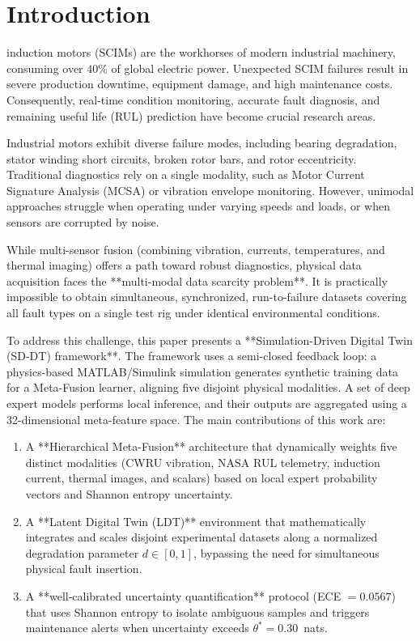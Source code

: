 \documentclass[journal]{IEEEtran}
\begin{document}
\section{Introduction}
 induction motors (SCIMs) are the workhorses of modern industrial machinery, consuming over $40\%$ of global electric power. Unexpected SCIM failures result in severe production downtime, equipment damage, and high maintenance costs. Consequently, real-time condition monitoring, accurate fault diagnosis, and remaining useful life (RUL) prediction have become crucial research areas.

Industrial motors exhibit diverse failure modes, including bearing degradation, stator winding short circuits, broken rotor bars, and rotor eccentricity. Traditional diagnostics rely on a single modality, such as Motor Current Signature Analysis (MCSA) or vibration envelope monitoring. However, unimodal approaches struggle when operating under varying speeds and loads, or when sensors are corrupted by noise.

While multi-sensor fusion (combining vibration, currents, temperatures, and thermal imaging) offers a path toward robust diagnostics, physical data acquisition faces the **multi-modal data scarcity problem**. It is practically impossible to obtain simultaneous, synchronized, run-to-failure datasets covering all fault types on a single test rig under identical environmental conditions.

To address this challenge, this paper presents a **Simulation-Driven Digital Twin (SD-DT) framework**. The framework uses a semi-closed feedback loop: a physics-based MATLAB/Simulink simulation generates synthetic training data for a Meta-Fusion learner, aligning five disjoint physical modalities. A set of deep expert models performs local inference, and their outputs are aggregated using a 32-dimensional meta-feature space. The main contributions of this work are:
\begin{enumerate}
    \item A **Hierarchical Meta-Fusion** architecture that dynamically weights five distinct modalities (CWRU vibration, NASA RUL telemetry, induction current, thermal images, and scalars) based on local expert probability vectors and Shannon entropy uncertainty.
    \item A **Latent Digital Twin (LDT)** environment that mathematically integrates and scales disjoint experimental datasets along a normalized degradation parameter $d \in [0, 1]$, bypassing the need for simultaneous physical fault insertion.
    \item A **well-calibrated uncertainty quantification** protocol (ECE $= 0.0567$) that uses Shannon entropy to isolate ambiguous samples and triggers maintenance alerts when uncertainty exceeds $\theta^* = 0.30$~nats.
\end{enumerate}
\end{document}
